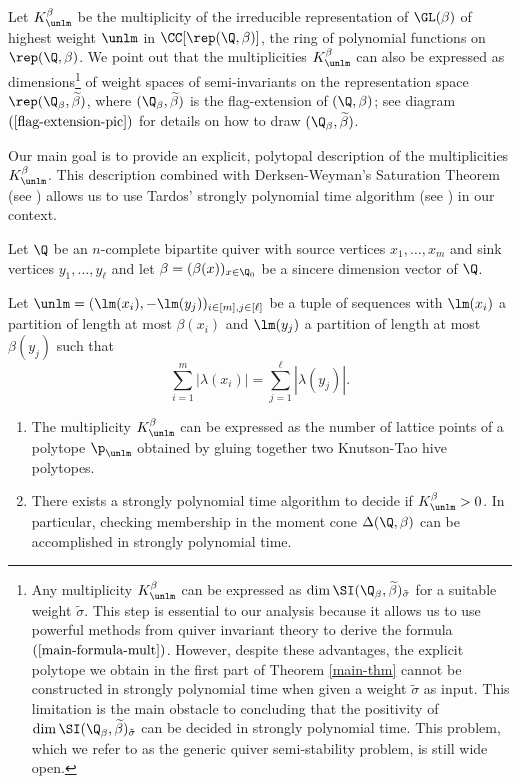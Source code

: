 Let $K^{\beta}_{\unlm}$ be the multiplicity of the irreducible representation of $\GL(\beta)$ of highest weight $\unlm$ in $\CC[\rep(\Q,\beta)]$, the ring of polynomial functions on $\rep(\Q, \beta)$. We point out that the multiplicities $K^{\beta}_{\unlm}$ can also be expressed as dimensions\footnote{Any multiplicity $K^{\beta}_{\unlm}$ can be expressed as $\dim \SI(\Q_\beta, \widetilde{\beta})_{\tilde\sigma}$ for a suitable weight $\widetilde{\sigma}$. This step is essential to our analysis because it allows us to use powerful methods from quiver invariant theory to derive the formula $(\ref{main-formula-mult})$. However, despite these advantages,  the explicit polytope we obtain in the first part of Theorem \ref{main-thm} cannot be constructed in strongly polynomial time when given a weight $\widetilde{\sigma}$ as input.  This limitation is the main obstacle to concluding that the positivity of $\dim \SI(\Q_\beta, \widetilde{\beta})_{\tilde{\sigma}}$ can be decided in strongly polynomial time.  This problem, which we refer to as the generic quiver semi-stability problem, is still wide open.} of weight spaces of semi-invariants on the representation space $\rep(\Q_\beta, \widetilde{\beta})$, where $(\Q_\beta, \widetilde{\beta})$ is the flag-extension of $(\Q, \beta)$; see diagram $(\ref{flag-extension-pic})$ for details on how to draw $(\Q_\beta, \widetilde{\beta})$.  

Our main goal is to provide an explicit, polytopal description of the multiplicities $K^{\beta}_{\unlm}$. This description combined with Derksen-Weyman's Saturation Theorem (see \cite{DW1}) allows us to use Tardos' strongly polynomial time algorithm (see \cite{Tar86}) in our context. 

\begin{theorem}
\label{main-thm} Let $\Q$ be an $n$-complete bipartite quiver with source vertices $x_1, \ldots, x_m$ and sink vertices $y_1, \ldots, y_\ell$ and let $\beta=(\beta(x))_{x \in \Q_0}$ be a sincere dimension vector of $\Q$. 

Let $\unlm=(\lm(x_i), -\lm(y_j))_{i \in [m], j \in [\ell] }$ be a tuple of sequences with $\lm(x_i)$ a partition of length at most $\beta(x_i)$ and $\lm(y_j)$ a partition of length at most $\beta(y_j)$ such that
$$
\sum_{i=1}^m |\lambda(x_i)|=\sum_{j=1}^{\ell} |\lambda(y_j)|.
$$

	\begin{enumerate}
		\item The multiplicity $K^{\beta}_{\unlm}$ can be expressed as the number of lattice points of a polytope $\p_{\unlm}$ obtained by gluing together two Knutson-Tao hive polytopes. 

		\item There exists a strongly polynomial time algorithm to decide if $K^{\beta}_{\unlm}>0$. In particular, checking membership in the moment cone $\Delta(\Q, \beta)$ can be accomplished in strongly polynomial time.
		\end{enumerate}

\end{theorem}


